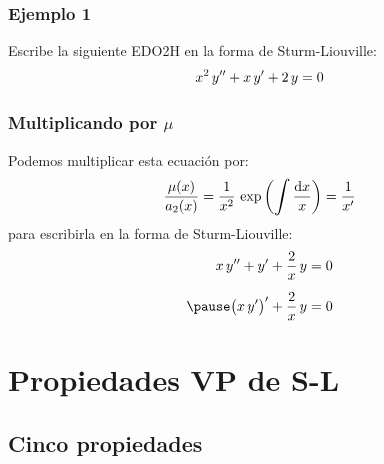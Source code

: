 \documentclass[12pt]{beamer}
\begin{document}
\begin{frame}
\frametitle{Ejemplo 1}\label{Ejemplo_01}
Escribe la siguiente EDO2H en la forma de Sturm-Liouville:
\pause
\begin{align*}
x^{2} \, {y}^{\prime \prime} + x \, {y}^{\prime} + 2 \, y = 0
\end{align*}
\end{frame}
\begin{frame}
\frametitle{Multiplicando por $\mu$}
Podemos multiplicar esta ecuación por:
\pause
\begin{align*}
\dfrac{\mu (x)}{a_{2}(x)} = \dfrac{1}{x^{2}} \, \exp \left( \scaleint{6ex} \, \dfrac{\dd{x}}{x} \right) = \dfrac{1}{\pderivada{x}}
\end{align*}
\pause
para escribirla en la forma de Sturm-Liouville:
\pause
\begin{eqnarray*}
\begin{aligned}
x \, \sderivada{y} + \pderivada{y} + \dfrac{2}{x} \, y &= 0 \\[0.5em] \pause
\big( x \, \pderivada{y} \big)^{\prime} +  \dfrac{2}{x} \, y &= 0    
\end{aligned}
\end{eqnarray*}
\end{frame}


\section{Propiedades VP de S-L}
\subsection{Cinco propiedades}
\end{document}
